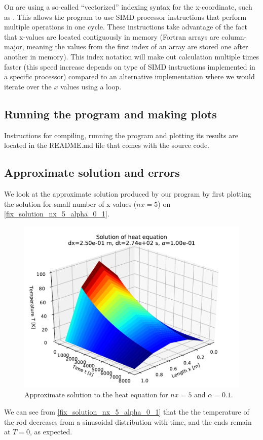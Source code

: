 On  are using a so-called ``vectorized'' indexing syntax for the x-coordinate, such as . This allows the program to use SIMD processor instructions that perform multiple operations in one cycle. These instructions take advantage of the fact that x-values are located contiguously in memory (Fortran arrays are column-major, meaning the values from the first index of an array are stored one after another in memory). This index notation will make out calculation multiple times faster (this speed increase depends on type of SIMD instructions implemented in a specific processor) compared to an alternative implementation where we would iterate over the $x$ values using a loop.


\subsection{Running the program and making plots}

Instructions for compiling, running the program and plotting its results are located in the README.md file that comes with the source code.



\subsection{Approximate solution and errors}

We look at the approximate solution produced by our program by first plotting the solution for small number of x values ($nx = 5$) on \autoref{fix_solution_nx_5_alpha_0_1}.
\begin{figure}[H]
  \centering
  \includegraphics[width=1.0\textwidth]{figures/solution_1_00e_01.pdf}
  \caption{Approximate solution to the heat equation for $nx=5$ and $\alpha = 0.1$.}
  \label{fix_solution_nx_5_alpha_0_1}
\end{figure}
We can see from \autoref{fix_solution_nx_5_alpha_0_1} that the the temperature of the rod decreases from a sinusoidal distribution with time, and the ends remain at $T=0$, as expected. 

